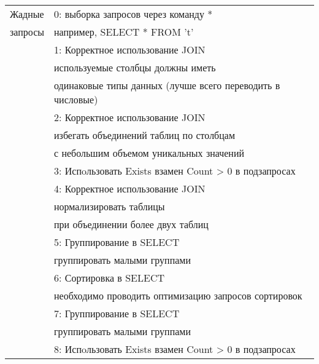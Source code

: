 \begin{longtable}[c]{|l|l|}
    Жадные   & 0: выборка запросов через команду *          \\
    запросы  & например, SELECT * FROM 't'      \\
             & 1: Корректное использование JOIN  \\
             & используемые столбцы должны иметь \\
             & одинаковые типы данных (лучше всего переводить в числовые)  \\
             & 2: Корректное использование JOIN  \\
             & избегать объединений таблиц по столбцам \\
             & с небольшим объемом уникальных значений \\
             & 3: Испoльзовать  Exists взамен Count > 0 в подзапросах \\
             & 4: Корректное использование JOIN  \\
             & нормализировать таблицы \\
             & при объединении более двух таблиц\\
             & 5: Группирование в SELECT \\
             & группировать малыми группами\\
             & 6: Сортировка в SELECT \\
             & необходимо проводить оптимизацию запросов сортировок \\
             & 7: Группирование в SELECT \\
             & группировать малыми группами\\
             & 8: Испoльзовать  Exists взамен Count > 0 в подзапросах \\
             

\end{longtable}
